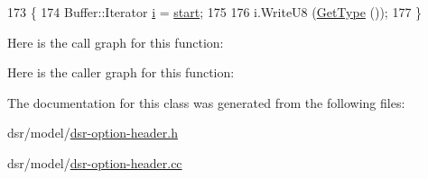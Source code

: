 \begin{DoxyCode}
173 \{
174   Buffer::Iterator \hyperlink{bernuolliDistribution_8m_a6f6ccfcf58b31cb6412107d9d5281426}{i} = \hyperlink{namespacevisualizer_1_1core_a2a35e5d8a34af358b508dac8635754e0}{start};
175 
176   i.WriteU8 (\hyperlink{classns3_1_1dsr_1_1DsrOptionHeader_a1f45f05b6f07be23f84dfd90fca2519f}{GetType} ());
177 \}
\end{DoxyCode}


Here is the call graph for this function\+:




Here is the caller graph for this function\+:




The documentation for this class was generated from the following files\+:\begin{DoxyCompactItemize}
\item 
dsr/model/\hyperlink{dsr-option-header_8h}{dsr-\/option-\/header.\+h}\item 
dsr/model/\hyperlink{dsr-option-header_8cc}{dsr-\/option-\/header.\+cc}\end{DoxyCompactItemize}
